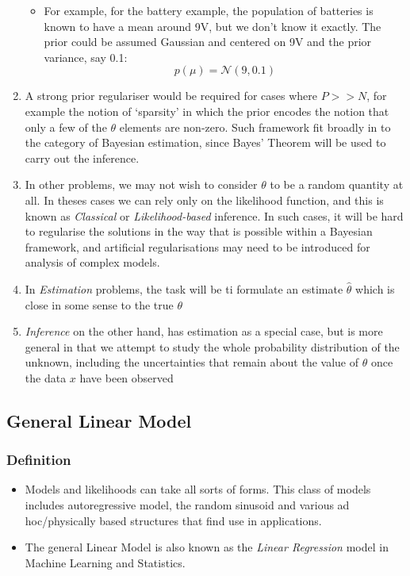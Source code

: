 \documentclass[12pt]{article}
\newcommand{\titc}[1]{\textit{\textcolor{blue1}{#1}}}
\newcommand{\gau}{\mathcal{N}}
\begin{document}
\begin{enumerate}
\begin{itemize}
    \item For example, for the battery example, the population of batteries is known to have a mean around 9V, but we don't know it exactly. The prior could be assumed Gaussian and centered on 9V and the prior variance, say 0.1:
    \[
    p(\mu) = \gau(9,0.1)
    \]
\end{itemize}
\item A strong prior regulariser would be required for cases where $P >> N$, for example the notion of `sparsity' in which the prior encodes the notion that only a few of the $\theta $ elements are non-zero. Such framework fit broadly in to the category of Bayesian estimation, since Bayes' Theorem will be used to carry out the inference.
\item In other problems, we may not wish to consider $\theta$ to be a random quantity at all. In theses cases we can rely only on the likelihood function, and this is known as \textit{Classical} or \textit{Likelihood-based} inference. In such cases, it will be hard to regularise the solutions in the way that is possible within a Bayesian framework, and artificial regularisations may need to be introduced for analysis of complex models.
\item In \textit{Estimation} problems, the task will be ti formulate an estimate $\hat{\theta}$ which is close in some sense to the true $\theta$
\item \textit{Inference} on the other hand, has estimation as a special case, but is more general in that we attempt to study the whole probability distribution of the unknown, including the uncertainties that remain about the value of $\theta$ once the data $x$ have been observed
\end{enumerate}
\subsection{General Linear Model}
\subsubsection{Definition}
\begin{itemize}
    \item Models and likelihoods can take all sorts of forms. This class of models includes autoregressive model, the random sinusoid and various ad hoc/physically based structures that find use in applications.
    \item The general Linear Model is also known as the \titc{Linear Regression} model in Machine Learning and Statistics.
\end{itemize}
\end{document}
